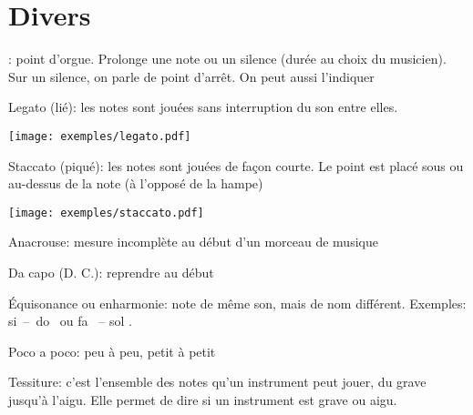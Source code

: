 \section{Divers}
\begin{description}
\item \fermata{} : point d'orgue. Prolonge une note ou un silence (durée au choix du musicien). Sur un silence, on parle de point d'arrêt. On peut aussi l'indiquer \fermatalong
\item Legato (lié): les notes sont jouées sans interruption du son entre elles.
\item \texttt{[image: exemples/legato.pdf]}
\item Staccato (piqué): les notes sont jouées de façon courte. Le point est placé sous ou au-dessus de la note (à l'opposé de la hampe)
\item \texttt{[image: exemples/staccato.pdf]}
\item Anacrouse: mesure incomplète au début d'un morceau de musique
\item Da capo (D. C.): reprendre au début 
\item Équisonance ou enharmonie: note de même son, mais de nom différent. Exemples: si~--~do~\flat{} ou fa~\sharp{} -- sol \flat.
\item Poco a poco: peu à peu, petit à petit
\item Tessiture: c'est l'ensemble des notes qu'un instrument peut jouer, du grave jusqu'à l'aigu. Elle permet de dire si un instrument est grave ou aigu.

\end{description}